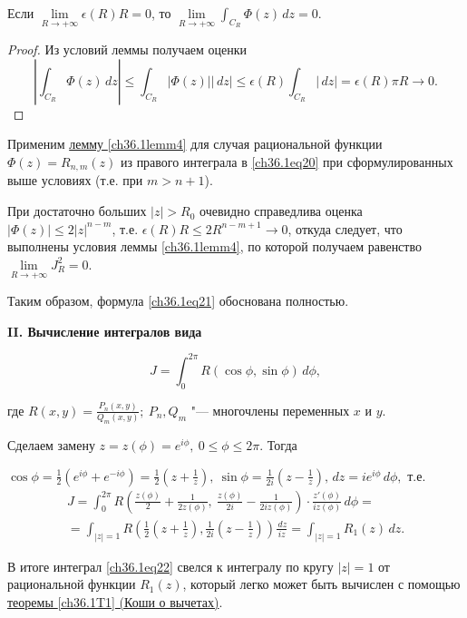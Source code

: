 \begin{leftbar}
\begin{lemm}
Если $\lim\limits_{R \to +\infty} \epsilon(R)R = 0$, то $\lim\limits_{R \to +\infty} \int_{C_R} \Phi(z)\,dz = 0$.
\end{lemm}

\begin{proof}
Из условий леммы получаем оценки
$$
\left| \int_{C_R} \Phi(z)\,dz \right| \le \int_{C_R} |\Phi(z)||\,dz| \le \epsilon(R) \int_{C_R}|\,dz| = \epsilon(R)\pi R \to 0.
$$
\end{proof}

Применим \hyperref[ch36.1lemm4]{лемму \ref{ch36.1lemm4}} для случая рациональной функции $\Phi(z) = R_{n,m}(z)$ из правого интеграла в \eqref{ch36.1eq20} при сформулированных выше условиях (т.е. при $m > n + 1$).

При достаточно больших $|z| > R_0$ очевидно справедлива оценка $|\Phi(z)| \le 2|z|^{n - m}$, т.е.
$\epsilon(R)R \le 2R^{n - m + 1} \to 0$, откуда следует, что выполнены условия леммы \ref{ch36.1lemm4}, по которой получаем равенство $\lim\limits_{R \to +\infty} J_R^2 = 0$.

Таким образом, формула \eqref{ch36.1eq21} обоснована полностью.

{\bf II. Вычисление интегралов вида}

\begin{equation} \label{ch36.1eq22}
J = \int_{0}^{2\pi} R(\cos \phi, \sin\phi)\,d\phi,
\end{equation}

где $R(x,y) = \frac{P_n(x,y)}{Q_m(x,y)}; \: P_n, Q_m$ "--- многочлены переменных $x$ и $y$.

Сделаем замену $z = z(\phi) = e^{i \phi}, \: 0 \le \phi \le 2\pi$. Тогда 

$\cos\phi = \frac{1}{2} (e^{i\phi} + e^{-i\phi}) = \frac{1}{2}\left( z + \frac{1}{z}\right), \: \sin\phi = \frac{1}{2i} \left(z - \frac{1}{z} \right), \,dz = i e^{i \phi} \,d\phi,$ т.е. 
\begin{multline*}
J = \int_0^{2\pi} R\left( \frac{z(\phi)}{2} + \frac{1}{2z(\phi)}, \: \frac{z(\phi)}{2i} - \frac{1}{2iz(\phi)}\right) \cdot \frac{z'(\phi)}{iz(\phi)} \,d\phi =\\= \int_{|z| = 1} R\left( \frac{1}{2} \left( z + \frac{1}{z}\right), \frac{1}{2i}\left( z - \frac{1}{z}\right)\right)\frac{\,dz}{iz} = \int_{|z| = 1} R_1(z)\,dz.
\end{multline*}

В итоге интеграл \eqref{ch36.1eq22} свелся к интегралу по кругу $|z| = 1$ от рациональной функции $R_1(z)$, который легко может быть вычислен с помощью  \hyperref[ch36.1T1]{теоремы \ref{ch36.1T1} (Коши о вычетах)}.


\end{leftbar}
